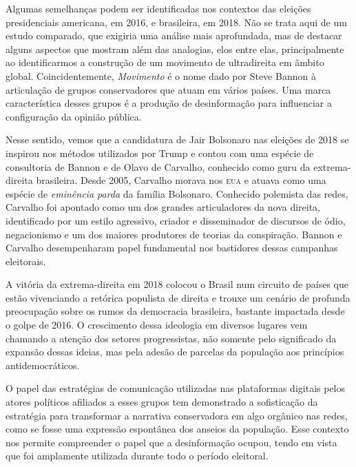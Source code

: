 Algumas semelhanças podem ser identificadas nos contextos das eleições
presidenciais americana, em 2016, e brasileira, em 2018. Não se trata aqui
de um estudo comparado, que exigiria uma análise mais aprofundada, mas de
destacar alguns aspectos que mostram além das analogias, elos entre
elas, principalmente ao identificarmos a construção de um movimento de
ultradireita em âmbito global. Coincidentemente, \textit{Movimento} é o nome dado
por Steve Bannon à articulação de grupos conservadores que atuam em
vários países. Uma marca característica desses grupos é a produção de
desinformação para influenciar a configuração da opinião pública.

Nesse sentido, vemos que a candidatura de Jair Bolsonaro nas eleições de
2018 se inspirou nos métodos utilizados por Trump e contou com uma
espécie de consultoria de Bannon e de Olavo de Carvalho, conhecido como
guru da extrema-direita brasileira. Desde 2005, Carvalho morava nos \textsc{eua}
e atuava como uma espécie de \textit{eminência parda} da família Bolsonaro.
Conhecido polemista das redes, Carvalho foi apontado como um dos grandes
articuladores da nova direita, identificado por um estilo agressivo,
criador e disseminador de discursos de ódio, negacionismo e um dos
maiores produtores de teorias da conspiração. Bannon e Carvalho
desempenharam papel fundamental nos bastidores dessas campanhas
eleitorais.

A vitória da extrema-direita em 2018 colocou o Brasil num circuito de
países que estão vivenciando a retórica populista de direita e trouxe um
cenário de profunda preocupação sobre os rumos da democracia brasileira,
bastante impactada desde o golpe de 2016. O crescimento dessa
ideologia em diversos lugares vem chamando a atenção dos setores
progressistas, não somente pelo significado da expansão dessas ideias,
mas pela adesão de parcelas da população aos princípios
antidemocráticos.

O papel das estratégias de comunicação utilizadas nas plataformas
digitais pelos atores políticos afiliados a esses grupos tem demonstrado
a sofisticação da estratégia para transformar a narrativa conservadora
em algo orgânico nas redes, como se fosse uma expressão espontânea dos
anseios da população. Esse contexto nos permite compreender o papel que
a desinformação ocupou, tendo em vista que foi amplamente utilizada
durante todo o período eleitoral.

